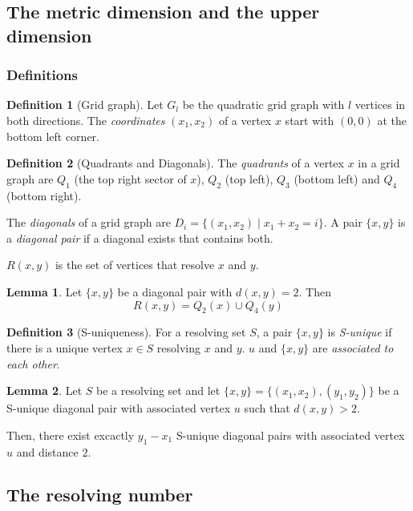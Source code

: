 \documentclass[hyperref={pdfpagelabels=false}]{beamer}
\theoremstyle{definition}
\newtheorem{dfn}{Definition}
\newtheorem{lem}{Lemma}
\begin{document}
\subsection{The metric dimension and the upper dimension}
\begin{frame}
	\frametitle{Definitions}
	\begin{dfn}[Grid graph]
		Let $G_l$ be the quadratic grid graph with $l$ vertices in both directions. The \emph{coordinates} $(x_1,x_2)$ of a vertex $x$ start with $(0,0)$ at the bottom left corner.
	\end{dfn}
	\begin{dfn}[Quadrants and Diagonals]
		The \emph{quadrants} of a vertex $x$ in a grid graph are $Q_1$ (the top right sector of $x$), $Q_2$ (top left), $Q_3$ (bottom left) and $Q_4$ (bottom right).

		The \emph{diagonals} of a grid graph are $D_i = \{ (x_1,x_2) \mid x_1 + x_2 = i \}$. A pair $\{x,y\}$ is a \emph{diagonal pair} if a diagonal exists that contains both.
	\end{dfn}
\end{frame}
\begin{frame}
	$R(x,y)$ is the set of vertices that resolve $x$ and $y$.
	\begin{lem}
		Let $\{x,y\}$ be a diagonal pair with $d(x,y) = 2$. Then
		\[ R(x,y) = Q_2(x) \cup Q_4(y) \]
	\end{lem}
	\begin{dfn}[S-uniqueness]
		For a resolving set $S$, a pair $\{x,y\}$ is \emph{S-unique} if there is a unique vertex $x \in S$ resolving $x$ and $y$. $u$ and $\{x,y\}$ are \emph{associated to each other}.
	\end{dfn}
\end{frame}
\begin{frame}
	\begin{lem}
		Let $S$ be a resolving set and let $\{x,y\} = \{(x_1,x_2),(y_1,y_2)\}$ be a S-unique diagonal pair with associated vertex $u$ such that $d(x,y)>2$.

		Then, there exist excactly $y_1 - x_1$ S-unique diagonal pairs with associated vertex $u$ and distance $2$.
	\end{lem}
\end{frame}
\subsection{The resolving number}
\begin{frame}
\end{frame}
\end{document}
